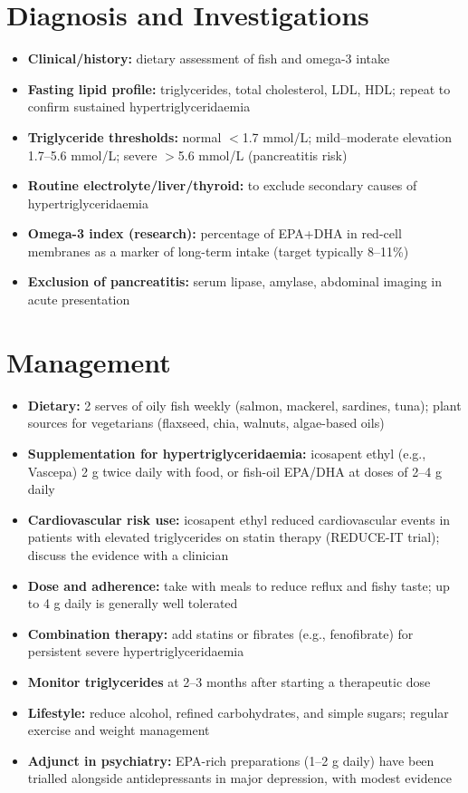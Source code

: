 \section*{Diagnosis and Investigations}
\begin{itemize}
    \item \textbf{Clinical/history:} dietary assessment of fish and omega-3 intake
    \item \textbf{Fasting lipid profile:} triglycerides, total cholesterol, LDL, HDL; repeat to confirm sustained hypertriglyceridaemia
    \item \textbf{Triglyceride thresholds:} normal $<$1.7 mmol/L; mild--moderate elevation 1.7--5.6 mmol/L; severe $>$5.6 mmol/L (pancreatitis risk)
    \item \textbf{Routine electrolyte/liver/thyroid:} to exclude secondary causes of hypertriglyceridaemia
    \item \textbf{Omega-3 index (research):} percentage of EPA+DHA in red-cell membranes as a marker of long-term intake (target typically 8--11\%)
    \item \textbf{Exclusion of pancreatitis:} serum lipase, amylase, abdominal imaging in acute presentation
\end{itemize}

\section*{Management}
\begin{itemize}
    \item \textbf{Dietary:} 2 serves of oily fish weekly (salmon, mackerel, sardines, tuna); plant sources for vegetarians (flaxseed, chia, walnuts, algae-based oils)
    \item \textbf{Supplementation for hypertriglyceridaemia:} icosapent ethyl (e.g., Vascepa) 2 g twice daily with food, or fish-oil EPA/DHA at doses of 2--4 g daily
    \item \textbf{Cardiovascular risk use:} icosapent ethyl reduced cardiovascular events in patients with elevated triglycerides on statin therapy (REDUCE-IT trial); discuss the evidence with a clinician
    \item \textbf{Dose and adherence:} take with meals to reduce reflux and fishy taste; up to 4 g daily is generally well tolerated
    \item \textbf{Combination therapy:} add statins or fibrates (e.g., fenofibrate) for persistent severe hypertriglyceridaemia
    \item \textbf{Monitor triglycerides} at 2--3 months after starting a therapeutic dose
    \item \textbf{Lifestyle:} reduce alcohol, refined carbohydrates, and simple sugars; regular exercise and weight management
    \item \textbf{Adjunct in psychiatry:} EPA-rich preparations (1--2 g daily) have been trialled alongside antidepressants in major depression, with modest evidence
\end{itemize}

